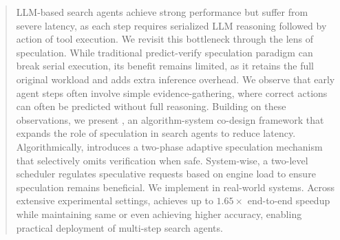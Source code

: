 \begin{abstract}
    LLM-based search agents achieve strong performance but suffer from severe latency, as each step requires serialized LLM reasoning followed by action of tool execution. 
    We revisit this bottleneck through the lens of speculation.
    While traditional predict-verify speculation paradigm can break serial execution, its benefit remains limited, as it retains the full original workload and adds extra inference overhead.
    We observe that early agent steps often involve simple evidence-gathering, where correct actions can often be predicted without full reasoning. 
    Building on these observations, we present \system, an algorithm-system co-design framework that expands the role of speculation in search agents to reduce latency.
    Algorithmically, \system introduces a two-phase adaptive speculation mechanism that selectively omits verification when safe.
    System-wise, a two-level scheduler regulates speculative requests based on engine load to ensure speculation remains beneficial.
    We implement \system in real-world systems. 
    Across extensive experimental settings, \system achieves up to $1.65\times$ end-to-end speedup while maintaining same or even achieving higher accuracy, enabling practical deployment of multi-step search agents.
\end{abstract}